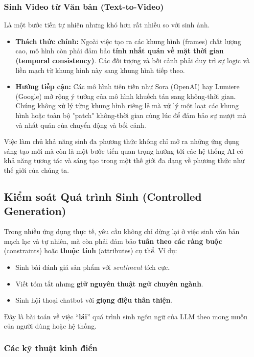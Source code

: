 \subsubsection{Sinh Video từ Văn bản (Text-to-Video)}
Là một bước tiến tự nhiên nhưng khó hơn rất nhiều so với sinh ảnh.
\begin{itemize}
    \item \textbf{Thách thức chính:} Ngoài việc tạo ra các khung hình (frames) chất lượng cao, mô hình còn phải đảm bảo \textbf{tính nhất quán về mặt thời gian (temporal consistency)}. Các đối tượng và bối cảnh phải duy trì sự logic và liền mạch từ khung hình này sang khung hình tiếp theo.
    \item \textbf{Hướng tiếp cận:} Các mô hình tiên tiến như Sora (OpenAI) hay Lumiere (Google) mở rộng ý tưởng của mô hình khuếch tán sang không-thời gian. Chúng không xử lý từng khung hình riêng lẻ mà xử lý một loạt các khung hình hoặc toàn bộ "patch" không-thời gian cùng lúc để đảm bảo sự mượt mà và nhất quán của chuyển động và bối cảnh.
\end{itemize}

Việc làm chủ khả năng sinh đa phương thức không chỉ mở ra những ứng dụng sáng tạo mới mà còn là một bước tiến quan trọng hướng tới các hệ thống AI có khả năng tương tác và sáng tạo trong một thế giới đa dạng về phương thức như thế giới của chúng ta.

\subsection{Kiểm soát Quá trình Sinh (Controlled Generation)}
\label{ssec:controlled_generation}

Trong nhiều ứng dụng thực tế, yêu cầu không chỉ dừng lại ở việc sinh văn bản mạch lạc và tự nhiên, mà còn phải đảm bảo \textbf{tuân theo các ràng buộc} (constraints) hoặc \textbf{thuộc tính} (attributes) cụ thể. Ví dụ:
\begin{itemize}
    \item Sinh bài đánh giá sản phẩm với \textit{sentiment} tích cực.
    \item Viết tóm tắt nhưng \textbf{giữ nguyên thuật ngữ chuyên ngành}.
    \item Sinh hội thoại chatbot với \textbf{giọng điệu thân thiện}.
\end{itemize}

Đây là bài toán về việc ``\textbf{lái}'' quá trình sinh ngôn ngữ của LLM theo mong muốn của người dùng hoặc hệ thống.

\subsubsection{Các kỹ thuật kinh điển}
\label{sssec:classic_controlled_generation}

